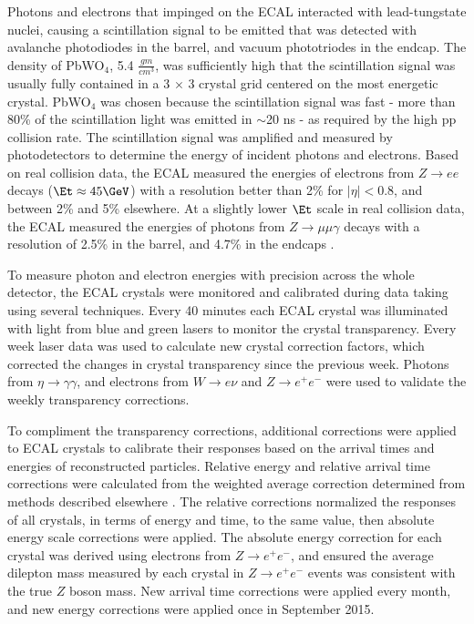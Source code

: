 Photons and electrons that impinged on the ECAL interacted with lead-tungstate nuclei, causing a scintillation 
signal to be emitted that was detected with avalanche photodiodes in the barrel, and vacuum phototriodes in the 
endcap.  The density of PbWO$_{4}$, 5.4 $\frac{gm}{cm^{3}}$, 
was sufficiently high that the scintillation signal was usually fully contained in a 3 $\times$ 3 crystal 
grid centered on the most energetic crystal.  PbWO$_{4}$ was chosen because the scintillation signal was fast - 
more than 80\% of the scintillation light was emitted in $\sim$20 ns - as required by the high pp collision rate.  
The scintillation signal was amplified and measured by photodetectors to determine the energy of incident 
photons and electrons.  Based on real collision data, the ECAL measured the energies of electrons from $Z \rightarrow ee$ 
decays ($\Et \approx 45 \GeV$) with a resolution better than 2\% for $|\eta| < 0.8$, and between 2\% and 5\% elsewhere.  
At a slightly lower $\Et$ scale in real collision data, the ECAL measured the energies of photons from $Z \rightarrow \mu\mu\gamma$ 
decays with a resolution of 2.5\% in the barrel, and 4.7\% in the endcaps \cite{ecalPerformanceInCollisions}.

To measure photon and electron energies with precision across the whole detector, the ECAL crystals were monitored and calibrated 
during data taking using several techniques.  Every 40 minutes each ECAL crystal was illuminated 
with light from blue and green lasers to monitor the crystal transparency.  Every week laser data 
was used to calculate new crystal correction factors, which corrected the changes in crystal transparency 
since the previous week.  Photons from $\eta \rightarrow \gamma\gamma$, and electrons from 
$W \rightarrow e\nu$ and $Z \rightarrow e^{+}e^{-}$ were used to validate the weekly transparency corrections.

To compliment the transparency corrections, additional corrections were applied to ECAL crystals 
to calibrate their responses based on the arrival times and energies of reconstructed particles.  Relative energy 
and relative arrival time corrections were calculated from 
the weighted average correction determined from methods described elsewhere \cite{eGammaMonitCalib2011}.  
The relative corrections normalized the responses of all crystals, in terms of energy and time, to the same value, then 
absolute energy scale corrections were applied.  The absolute energy correction for each crystal was derived using 
electrons from $Z \rightarrow e^{+}e^{-}$, and ensured the average dilepton mass measured by each crystal in 
$Z \rightarrow e^{+}e^{-}$ events was consistent with the true $Z$ boson mass.  New arrival time corrections 
were applied every month, and new energy corrections were applied once in September 2015.

